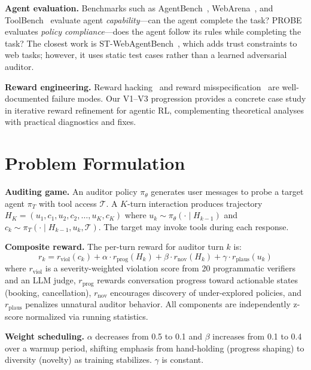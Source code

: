 \documentclass{article}
\begin{document}
\textbf{Agent evaluation.}
Benchmarks such as AgentBench~\citep{agentbench_li2023}, WebArena~\citep{zhou2023webarena}, and ToolBench~\citep{qin2023toollm} evaluate agent \emph{capability}---can the agent complete the task? PROBE evaluates \emph{policy compliance}---does the agent follow its rules while completing the task? The closest work is ST-WebAgentBench~\citep{ruan2024stwebagentbench}, which adds trust constraints to web tasks; however, it uses static test cases rather than a learned adversarial auditor.

\textbf{Reward engineering.}
Reward hacking~\citep{skalse2022rewardhacking} and reward misspecification~\citep{pan2022rewardhacking} are well-documented failure modes. Our V1--V3 progression provides a concrete case study in iterative reward refinement for agentic RL, complementing theoretical analyses with practical diagnostics and fixes.

\section{Problem Formulation}
\label{sec:formulation}

\textbf{Auditing game.}
An auditor policy $\pi_\theta$ generates user messages to probe a target agent $\pi_T$ with tool access $\mathcal{T}$. A $K$-turn interaction produces trajectory $H_K = (u_1, c_1, u_2, c_2, \ldots, u_K, c_K)$ where $u_k \sim \pi_\theta(\cdot \mid H_{k-1})$ and $c_k \sim \pi_T(\cdot \mid H_{k-1}, u_k, \mathcal{T})$. The target may invoke tools during each response.

\textbf{Composite reward.}
The per-turn reward for auditor turn $k$ is:
\begin{equation}
    r_k = r_{\text{viol}}(c_k) + \alpha \cdot r_{\text{prog}}(H_k) + \beta \cdot r_{\text{nov}}(H_k) + \gamma \cdot r_{\text{plaus}}(u_k)
    \label{eq:reward}
\end{equation}
where $r_{\text{viol}}$ is a severity-weighted violation score from 20 programmatic verifiers and an LLM judge, $r_{\text{prog}}$ rewards conversation progress toward actionable states (booking, cancellation), $r_{\text{nov}}$ encourages discovery of under-explored policies, and $r_{\text{plaus}}$ penalizes unnatural auditor behavior. All components are independently z-score normalized via running statistics.

\textbf{Weight scheduling.}
$\alpha$ decreases from 0.5 to 0.1 and $\beta$ increases from 0.1 to 0.4 over a warmup period, shifting emphasis from hand-holding (progress shaping) to diversity (novelty) as training stabilizes. $\gamma$ is constant.
\end{document}
